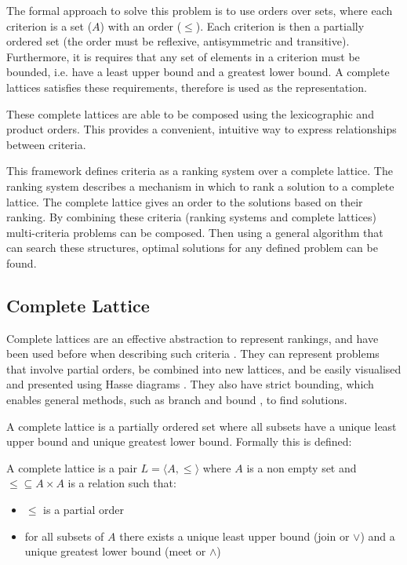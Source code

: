 The formal approach to solve this problem is to use orders over sets, 
where each criterion is a set ($A$) with an order ($\leq$).
Each criterion is then a partially ordered set (the order must be reflexive, antisymmetric and transitive).
Furthermore, it is requires that any set of elements in a criterion must be bounded, 
i.e. have a least upper bound and a greatest lower bound.
A complete lattices satisfies these requirements, therefore is used as the representation. 

These complete lattices are able to be composed using the lexicographic and product orders.
This provides a convenient, intuitive way to express relationships between criteria.

This framework defines criteria as a ranking system over a complete lattice.
The ranking system describes a mechanism in which to rank a solution to a complete lattice. 
The complete lattice gives an order to the solutions based on their ranking.
By combining these criteria (ranking systems and complete lattices) multi-criteria problems can be composed.
Then using a general algorithm that can search these structures, 
optimal solutions for any defined problem can be found.

\subsection{Complete Lattice}
Complete lattices are an effective abstraction to represent rankings,
and have been used before when describing such criteria \cite{Bistarelli1997,Fernandez}.
They can represent problems that involve partial orders,
be combined into new lattices,
and be easily visualised and presented using Hasse diagrams \cite{davey1990introduction}.
They also have strict bounding, which enables general methods, such as branch and bound \cite{Land1960}, to find solutions.

A complete lattice is a partially ordered set where all subsets have a unique least upper bound and unique greatest lower bound.
Formally this is defined:
\begin{defs}
A complete lattice is a pair $L = \langle A, \leq \rangle$ where $A$ is a non empty set 
and $\leq \subseteq A \times A$ is a relation such that:
\begin{itemize}
  \item $\leq$ is a partial order
  \item for all subsets of $A$ there exists a unique least upper bound (join or $\vee$) and a unique greatest lower bound (meet or $\wedge$)
\end{itemize}
\end{defs}

